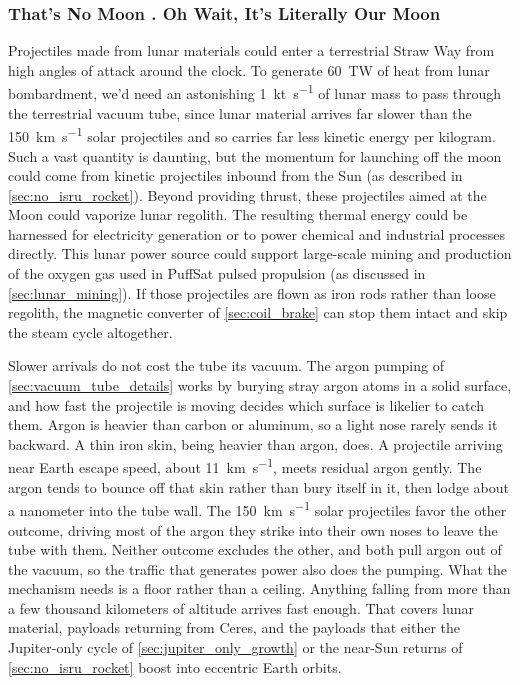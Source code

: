 \documentclass{article}
\begin{document}
\subsubsection{That's No Moon .  Oh Wait, It's Literally Our Moon}\cite{kenobi1977moon}
Projectiles made from lunar materials could enter a terrestrial Straw Way from high angles of attack around the clock.  To generate \SI{60}{\tera\watt} of heat from lunar bombardment, we'd need an astonishing \SI{1}{\kilo\tonne\per\second} of lunar mass to pass through the terrestrial vacuum tube, since lunar material arrives far slower than the \SI{150}{\kilo\meter\per\second} solar projectiles and so carries far less kinetic energy per kilogram. Such a vast quantity is daunting, but the momentum for launching off the moon could come from kinetic projectiles inbound from the Sun (as described in \autoref{sec:no_isru_rocket}). Beyond providing thrust, these projectiles aimed at the Moon could vaporize lunar regolith. The resulting thermal energy could be harnessed for electricity generation or to power chemical and industrial processes directly. This lunar power source could support large-scale mining and production of the oxygen gas used in PuffSat pulsed propulsion  (as discussed in \autoref{sec:lunar_mining}).  If those projectiles are flown as iron rods rather than loose regolith, the magnetic converter of \autoref{sec:coil_brake} can stop them intact and skip the steam cycle altogether.

Slower arrivals do not cost the tube its vacuum. The argon pumping of \autoref{sec:vacuum_tube_details} works by burying stray argon atoms in a solid surface, and how fast the projectile is moving decides which surface is likelier to catch them. Argon is heavier than carbon or aluminum, so a light nose rarely sends it backward. A thin iron skin, being heavier than argon, does. A projectile arriving near Earth escape speed, about \SI{11}{\kilo\meter\per\second}, meets residual argon gently. The argon tends to bounce off that skin rather than bury itself in it, then lodge about a nanometer into the tube wall. The \SI{150}{\kilo\meter\per\second} solar projectiles favor the other outcome, driving most of the argon they strike into their own noses to leave the tube with them. Neither outcome excludes the other, and both pull argon out of the vacuum, so the traffic that generates power also does the pumping. What the mechanism needs is a floor rather than a ceiling. Anything falling from more than a few thousand kilometers of altitude arrives fast enough. That covers lunar material, payloads returning from Ceres, and the payloads that either the Jupiter-only cycle of \autoref{sec:jupiter_only_growth} or the near-Sun returns of \autoref{sec:no_isru_rocket} boost into eccentric Earth orbits.
\end{document}
